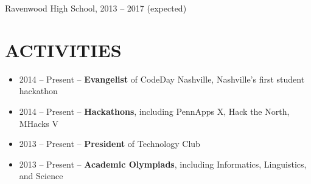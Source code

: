 \documentclass{res}
\begin{document}
Ravenwood High School, 2013 -- 2017 {(expected)}

\section{ACTIVITIES}

\begin{itemize}
  \item 2014 -- Present -- \textbf{Evangelist} of CodeDay Nashville, Nashville's first student hackathon
  \item 2014 -- Present -- \textbf{Hackathons}, including PennApps X, Hack the North, MHacks V
  \item 2013 -- Present -- \textbf{President} of Technology Club
  \item 2013 -- Present -- \textbf{Academic Olympiads}, including Informatics, Linguistics, and Science
\end{itemize}
\end{document}
